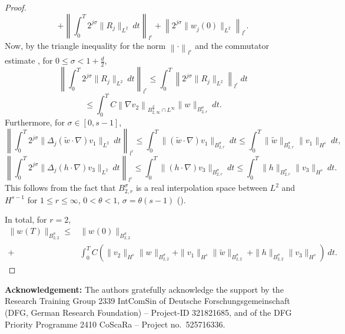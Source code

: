 \documentclass{amsart}
\begin{document}
\begin{proof}
$$+ \left\|\int_0^T 2^{j\sigma}\|R_j\|_{L^2} \ dt \right\|_{\textit{l}^r}+ \left\|2^{j\sigma}\|w^{}_j(0)\|_{L^2}\right\|_{\textit{l}^r}.$$
Now, by the triangle inequality for the norm $\left\|\cdot\right\|_{\textit{l}^r}$ and the commutator estimate \cite[Lemma 2.100]{Bahouri.2011}, for $0\leq \sigma < 1 +\frac{d}{2}$,
$$\left\|\int_0^T 2^{j\sigma}\|R_j\|_{L^2} \ dt \right\|_{\textit{l}^r} \leq\int_0^T  \left\|2^{j\sigma}\|R_j\|_{L^2} \right\|_{\textit{l}^r}\ dt $$ $$\leq \int_0^T C \left\|\nabla v_2\right\|_{{B^{\frac{d}{2}}_{2,\infty}}\cap L^{\infty}} \|w^{}\|_{B^{\sigma}_{2,r}}   \ dt .$$
Furthermore, for $\sigma \in [0,s-1]$,
$$\left\|\int_0^T 2^{j\sigma}\|\Delta_j (\tilde{w} \cdot \nabla) v_1\|_{L^2}  \ dt\right\|_{\textit{l}^r}\leq \int_0^T \|(\tilde{w} \cdot \nabla) v_1\|_{B^{\sigma}_{2,r}}\ dt \leq \int_0^T \|\tilde{w}\|_{B^{\sigma}_{2,r}} \|v_1\|_{H^s}\ dt, $$
$$ \left\|\int_0^T 2^{j\sigma}\|\Delta_j(h\cdot \nabla) v_3 \|_{L^2}  \ dt\right\|_{\textit{l}^r}  \leq \int_0^T \|(h\cdot \nabla) v_3 \|_{B^{\sigma}_{2,r}}\ dt  \leq \int_0^T \|h \|_{B^{\sigma}_{2,r}} \|v_3\|_{H^s}\ dt. $$
This follows from the fact that $B^{\sigma}_{2,r}$ is a real interpolation space between $L^2$ and $H^{s-1}$ for $1\leq r \leq \infty$, $0< \theta <1$, $ \sigma = \theta (s-1)$ (\cite[Thm. 6.4.5]{Bergh.1976}).

In total, for $r=2$,
\begin{align*} \|w^{}(T)\|_{B^{\sigma}_{2,2}} \leq & \|w^{}(0)\|_{B^{\sigma}_{2,2}}\\
+ &\int_0^T C \left(\| v_2\|_{{H^s}} \|w^{} \|_{B^{\sigma}_{2,2}} + \|v_1\|_{H^s} \|\tilde{w}\|_{B^{\sigma}_{2,2}}    \ + \|h\|_{B^{\sigma}_{2,2}} \|v_3\|_{H^s}\right)\ dt.
\end{align*}
\end{proof}


\textbf{Acknowledgement:} The authors gratefully acknowledge the support by the Research Training Group 2339 IntComSin of Deutsche Forschungsgemeinschaft (DFG, German Research Foundation) -- Project-ID 321821685, and of the DFG Priority Programme 2410 CoScaRa -- Project no.~525716336.

\printbibliography
\end{document}
